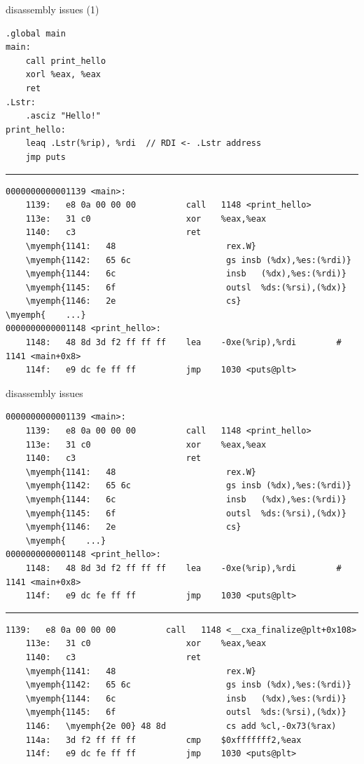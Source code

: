 \begin{frame}[fragile]{disassembly issues (1)}
\begin{lstlisting}[language=myasm,style=size8]
.global main
main:
    call print_hello
    xorl %eax, %eax
    ret
.Lstr:
    .asciz "Hello!"
print_hello:
    leaq .Lstr(%rip), %rdi  // RDI <- .Lstr address
    jmp puts
\end{lstlisting}
\hrule
\begin{Verbatim}[fontsize=\fontsize{8}{9},commandchars=\\\{\}]
0000000000001139 <main>:
    1139:	e8 0a 00 00 00       	call   1148 <print_hello>
    113e:	31 c0                	xor    %eax,%eax
    1140:	c3                   	ret    
    \myemph{1141:	48                   	rex.W}
    \myemph{1142:	65 6c                	gs insb (%dx),%es:(%rdi)}
    \myemph{1144:	6c                   	insb   (%dx),%es:(%rdi)}
    \myemph{1145:	6f                   	outsl  %ds:(%rsi),(%dx)}
    \myemph{1146:	2e                   	cs}
\myemph{	...}
0000000000001148 <print_hello>:
    1148:	48 8d 3d f2 ff ff ff 	lea    -0xe(%rip),%rdi        # 1141 <main+0x8>
    114f:	e9 dc fe ff ff       	jmp    1030 <puts@plt>
\end{Verbatim}
\end{frame}

\begin{frame}[fragile]{disassembly issues}
\begin{Verbatim}[fontsize=\fontsize{8}{9},commandchars=\\\{\}]
0000000000001139 <main>:
    1139:	e8 0a 00 00 00       	call   1148 <print_hello>
    113e:	31 c0                	xor    %eax,%eax
    1140:	c3                   	ret    
    \myemph{1141:	48                   	rex.W}
    \myemph{1142:	65 6c                	gs insb (%dx),%es:(%rdi)}
    \myemph{1144:	6c                   	insb   (%dx),%es:(%rdi)}
    \myemph{1145:	6f                   	outsl  %ds:(%rsi),(%dx)}
    \myemph{1146:	2e                   	cs}
    \myemph{	...}
0000000000001148 <print_hello>:
    1148:	48 8d 3d f2 ff ff ff 	lea    -0xe(%rip),%rdi        # 1141 <main+0x8>
    114f:	e9 dc fe ff ff       	jmp    1030 <puts@plt>
\end{Verbatim}
\hrule
\begin{Verbatim}[fontsize=\fontsize{8}{9},commandchars=\\\{\}]
    1139:	e8 0a 00 00 00       	call   1148 <__cxa_finalize@plt+0x108>
    113e:	31 c0                	xor    %eax,%eax
    1140:	c3                   	ret    
    \myemph{1141:	48                   	rex.W}
    \myemph{1142:	65 6c                	gs insb (%dx),%es:(%rdi)}
    \myemph{1144:	6c                   	insb   (%dx),%es:(%rdi)}
    \myemph{1145:	6f                   	outsl  %ds:(%rsi),(%dx)}
    1146:	\myemph{2e 00} 48 8d          	cs add %cl,-0x73(%rax)
    114a:	3d f2 ff ff ff       	cmp    $0xfffffff2,%eax
    114f:	e9 dc fe ff ff       	jmp    1030 <puts@plt>
\end{Verbatim}
\end{frame}


